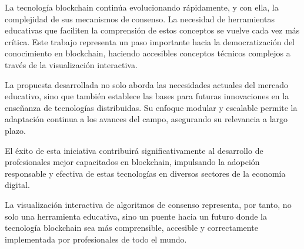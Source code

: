 \documentclass[spanish,12pt,letterpaper]{report}
\begin{document}
La tecnología blockchain continúa evolucionando rápidamente, y con ella, la complejidad de sus mecanismos de consenso. La necesidad de herramientas educativas que faciliten la comprensión de estos conceptos se vuelve cada vez más crítica. Este trabajo representa un paso importante hacia la democratización del conocimiento en blockchain, haciendo accesibles conceptos técnicos complejos a través de la visualización interactiva.

La propuesta desarrollada no solo aborda las necesidades actuales del mercado educativo, sino que también establece las bases para futuras innovaciones en la enseñanza de tecnologías distribuidas. Su enfoque modular y escalable permite la adaptación continua a los avances del campo, asegurando su relevancia a largo plazo.

El éxito de esta iniciativa contribuirá significativamente al desarrollo de profesionales mejor capacitados en blockchain, impulsando la adopción responsable y efectiva de estas tecnologías en diversos sectores de la economía digital.

La visualización interactiva de algoritmos de consenso representa, por tanto, no solo una herramienta educativa, sino un puente hacia un futuro donde la tecnología blockchain sea más comprensible, accesible y correctamente implementada por profesionales de todo el mundo.

\printbibliography
\end{document}
